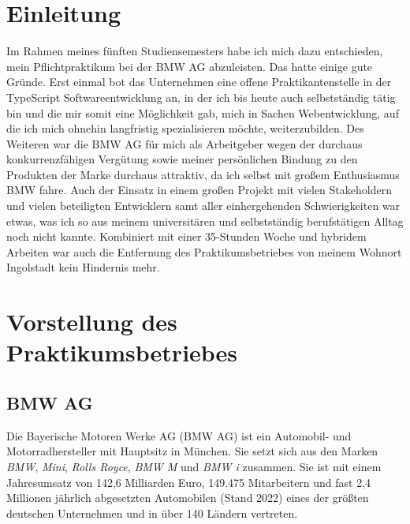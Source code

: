 \documentclass[11pt, a4paper, oneside]{scrartcl}
\begin{document}
        \newpage

    \section{Einleitung}
    Im Rahmen meines fünften Studiensemesters habe ich mich dazu entschieden, mein Pflichtpraktikum
    bei der BMW AG abzuleisten.
    Das hatte einige gute Gründe.
    Erst einmal bot das Unternehmen eine offene Praktikantenstelle in der TypeScript
    Softwareentwicklung an, in der ich bis heute auch selbstständig tätig bin und die mir somit eine
    Möglichkeit gab, mich in Sachen Webentwicklung,
    auf die ich mich ohnehin langfristig spezialisieren möchte, weiterzubilden.
    Des Weiteren war die BMW AG für mich als Arbeitgeber wegen der durchaus konkurrenzfähigen
    Vergütung sowie meiner persönlichen Bindung zu den Produkten der Marke durchaus attraktiv,
    da ich selbst mit großem Enthusiasmus BMW fahre.
    Auch der Einsatz in einem großen Projekt mit vielen Stakeholdern und vielen beteiligten
    Entwicklern samt aller einhergehenden Schwierigkeiten war etwas, was ich so aus meinem
    universitären und selbstständig berufstätigen Alltag noch nicht kannte. Kombiniert mit einer 
    35-Stunden Woche und hybridem Arbeiten war auch die Entfernung des Praktikumsbetriebes von
    meinem Wohnort Ingolstadt kein Hindernis mehr.

    \section{Vorstellung des Praktikumsbetriebes}

        \subsection{BMW AG}
        Die Bayerische Motoren Werke AG (BMW AG) ist ein Automobil- und Motorradhersteller mit
        Hauptsitz in München.
        Sie setzt sich aus den Marken \textit{BMW}, \textit{Mini}, \textit{Rolls Royce},
        \textit{BMW M} und \textit{BMW i} zusammen.
        Sie ist mit einem Jahresumsatz von 142,6 Milliarden Euro,
        149.475 Mitarbeitern und fast 2,4 Millionen jährlich abgesetzten Automobilen
        (Stand 2022) eines der größten deutschen Unternehmen und in über 140 Ländern vertreten.
        \textcite{bmw:bericht,bmw:standorte}
\end{document}
